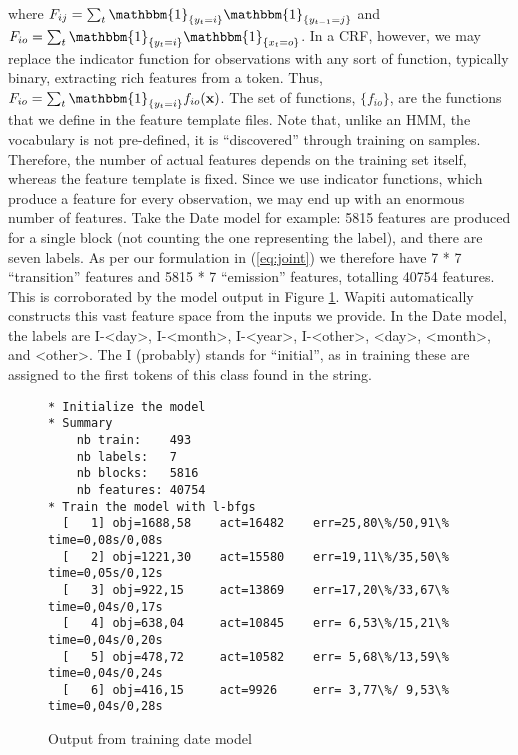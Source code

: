 \documentclass[10pt, oneside]{scrartcl}   	%
\begin{document}
where $F_{ij} = \sum_t\mathbbm{1}_{\{y_t = i\}}\mathbbm{1}_{\{y_{t-1} = j\}}$ and $F_{io} = \sum_t\mathbbm{1}_{\{y_t = i\}}\mathbbm{1}_{\{x_t = o\}}$. In a CRF, however, we may replace the indicator function for observations with any sort of function, typically binary, extracting rich features from a token. Thus, $F_{io} = \sum_t\mathbbm{1}_{\{y_t = i\}}f_{io}(\textbf{x})$. The set of functions, $\{f_{io}\}$, are the functions that we define in the feature template files. Note that, unlike an HMM, the vocabulary is not pre-defined, it is ``discovered'' through training on samples. Therefore, the number of actual features depends on the training set itself, whereas the feature template is fixed. Since we use indicator functions, which produce a feature for every observation, we may end up with an enormous number of features. Take the Date model for example: 5815 features are produced for a single block (not counting the one representing the label), and there are seven labels. As per our formulation in (\ref{eq:joint}) we therefore have 7 * 7 ``transition'' features and 5815 * 7 ``emission'' features, totalling 40754 features. This is corroborated by the model output in Figure \ref{fig:output}. Wapiti automatically constructs this vast feature space from the inputs we provide. In the Date model, the labels are I-<day>, I-<month>, I-<year>, I-<other>, <day>, <month>, and <other>. The I (probably) stands for ``initial'', as in training these are assigned to the first tokens of this class found in the string.

\begin{figure}
\begin{verbatim}
* Initialize the model
* Summary
    nb train:    493
    nb labels:   7
    nb blocks:   5816
    nb features: 40754
* Train the model with l-bfgs
  [   1] obj=1688,58    act=16482    err=25,80\%/50,91\% time=0,08s/0,08s
  [   2] obj=1221,30    act=15580    err=19,11\%/35,50\% time=0,05s/0,12s
  [   3] obj=922,15     act=13869    err=17,20\%/33,67\% time=0,04s/0,17s
  [   4] obj=638,04     act=10845    err= 6,53\%/15,21\% time=0,04s/0,20s
  [   5] obj=478,72     act=10582    err= 5,68\%/13,59\% time=0,04s/0,24s
  [   6] obj=416,15     act=9926     err= 3,77\%/ 9,53\% time=0,04s/0,28s
\end{verbatim}
\caption{Output from training date model}
\label{fig:output}
\end{figure}
\end{document}
